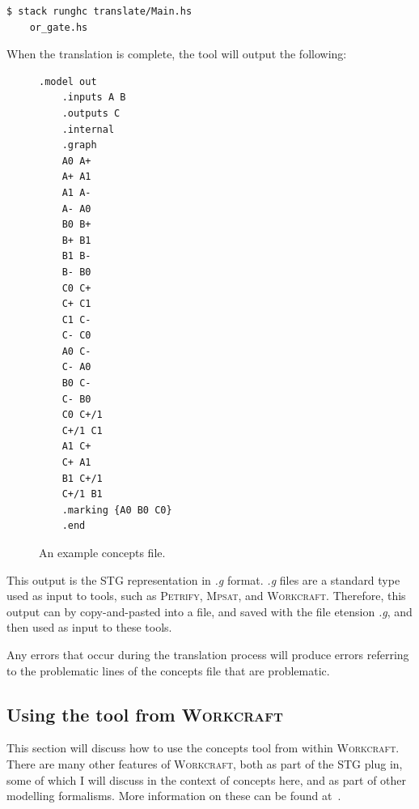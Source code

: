 \documentclass[british,conference,compsoc]{IEEEtran}
\newcommand{\noun}[1]{\textsc{#1}}
\begin{document}
\vspace{-2mm}

\begin{lstlisting}[language=bash]
  $ stack runghc translate/Main.hs 
  	or_gate.hs
\end{lstlisting}

\vspace{-1mm}

When the translation is complete, the tool will output the following:
\begin{figure}[h]
\begin{lstlisting}[language=bash]
	.model out
	.inputs A B
	.outputs C
	.internal
	.graph
	A0 A+
	A+ A1
	A1 A-
	A- A0
	B0 B+
	B+ B1
	B1 B-
	B- B0
	C0 C+
	C+ C1
	C1 C-
	C- C0
	A0 C-
	C- A0
	B0 C-
	C- B0
	C0 C+/1
	C+/1 C1
	A1 C+
	C+ A1
	B1 C+/1
	C+/1 B1
	.marking {A0 B0 C0}
	.end
\end{lstlisting}
\vspace{-3mm}
\protect\caption{\label{fig:concepts_filed}An example concepts file.}

\vspace{-5mm}
\end{figure}

This output is the STG representation in \emph{.g} format. \emph{.g} files are 
a standard type used as input to tools, such as \noun{Petrify}, \noun{Mpsat}, 
and \noun{Workcraft}. Therefore, this output can by copy-and-pasted into a file,
and saved with the file etension \emph{.g}, and then used as input to these 
tools. 

Any errors that occur during the translation process will produce errors 
referring to the problematic lines of the concepts file that are problematic. 

\vspace{-2mm}

\subsection{Using the tool from \noun{Workcraft} \label{sec:workcraft_usage}}

\vspace{-2mm}

This section will discuss how to use the concepts tool from within
\noun{Workcraft}. There are many other features of \noun{Workcraft}, both as 
part of the STG plug in, some of which I will discuss in the context of 
concepts here, and as part of other modelling formalisms. More information on 
these can be found at~\cite{Workcraft_website}.
\end{document}
